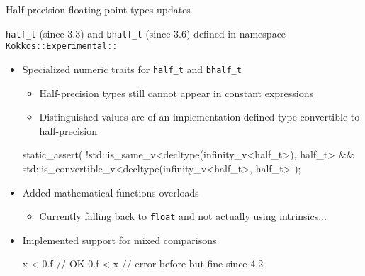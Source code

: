 \begin{frame}[fragile]{Half-precision floating-point types updates}

\texttt{half\_t} (since 3.3) and \texttt{bhalf\_t} (since 3.6) defined in
namespace \texttt{Kokkos::Experimental::}

\begin{itemize}
\item Specialized numeric traits for \texttt{half\_t} and \texttt{bhalf\_t}
  \begin{itemize}
  \item Half-precision types still cannot appear in constant
  expressions
  \item Distinguished values are of an implementation-defined type
  convertible to half-precision
  \end{itemize}
\begin{code}
static_assert(
  !std::is_same_v<decltype(infinity_v<half_t>), half_t> &&
  std::is_convertible_v<decltype(infinity_v<half_t>, half_t>
);
\end{code}
\item Added mathematical functions overloads
  \begin{itemize}
  \item Currently falling back to \texttt{float} and not actually using
        intrinsics...
  \end{itemize}
\item Implemented support for mixed comparisons
\begin{code}
x < 0.f  // OK
0.f < x  // error before but fine since 4.2
\end{code}
\end{itemize}
\end{frame}
